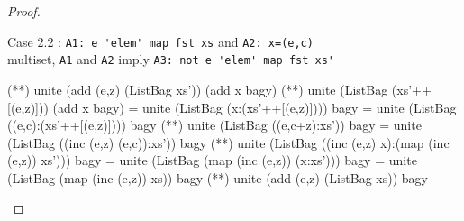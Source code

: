 \begin{proof}
\begin{code}
\end{code}
\hspace{1cm}Case 2.2 : \verb|A1: e 'elem' map fst xs| and \verb|A2: x=(e,c)|\\
multiset, \verb|A1| and \verb|A2| imply \verb|A3: not e 'elem' map fst xs'|
\begin{code}
             (**) unite (add (e,z) (ListBag xs')) (add x bagy)
             (**) unite (ListBag (xs'++[(e,z)])) (add x bagy)
             = unite (ListBag (x:(xs'++[(e,z)]))) bagy
             = unite (ListBag ((e,c):(xs'++[(e,z)]))) bagy
             (*\sEq{\ref{incLemma}}*) unite (ListBag ((e,c+z):xs')) bagy
             = unite (ListBag ((inc (e,z) (e,c)):xs')) bagy
             (*\sEq{\ref{mapLemma}}*) unite (ListBag ((inc (e,z) x):(map (inc (e,z)) xs'))) bagy
             = unite (ListBag (map (inc (e,z)) (x:xs'))) bagy
             = unite (ListBag (map (inc (e,z)) xs)) bagy
             (**) unite (add (e,z) (ListBag xs)) bagy
\end{code}
\end{proof}
\begin{comment}
\begin{lemma}{Associativity of \verb|unite|}
\begin{code}
unite (ListBag xs) (unite (ListBag ys) (ListBag zs))
          = unite (unite (ListBag xs) (ListBag ys)) (ListBag zs)
\end{code}
\end{lemma}
\begin{proof}by structural induction on xs\\
\verb|xs=[]|
\begin{code}
unite (ListBag xs) (unite (ListBag ys) (ListBag zs))
          = unite (ListBag []) (unite (ListBag ys) (ListBag zs))
          = unite (ListBag ys) (ListBag zs)
          = unite (unite (ListBag []) (ListBag ys)) (ListBag zs)
          = unite (unite (ListBag xs) (ListBag ys)) (ListBag zs)
\end{code}
\verb|xs=(x:xs')|
\begin{code}
unite (ListBag xs) (unite (ListBag ys) (ListBag zs))
          = unite (ListBag (x:xs')) (unite (ListBag ys) (ListBag zs))
          = unite (ListBag xs') (add x (unite (ListBag ys) (ListBag zs)))
          (*\sEq{\ref{addLemma}}*) unite (ListBag xs') (unite (add x (ListBag ys)) (ListBag zs))
          (*\sEq{IH}*) unite (unite (ListBag xs') (add x (ListBag ys))) (ListBag zs)
          = unite (unite (ListBag (x:xs')) (ListBag ys)) (ListBag zs)
          = unite (unite (ListBag xs) (ListBag ys)) (ListBag zs)
\end{code}
\end{proof}
\end{comment}
